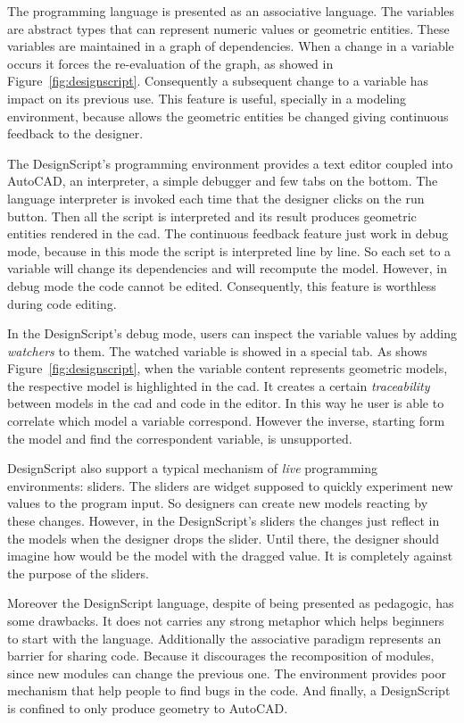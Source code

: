 The programming language is presented as an associative language. The variables are abstract types that can represent numeric values or geometric entities. These variables are maintained in a graph of dependencies. When a change in a variable occurs it forces the re-evaluation of the graph, as showed in Figure~\ref{fig:designscript}. Consequently a subsequent change to a variable has impact on its previous use. This feature is useful, specially in a modeling environment, because allows the geometric entities be changed giving continuous feedback to the designer.

The DesignScript's programming environment provides a text editor coupled into AutoCAD, an interpreter, a simple debugger and few tabs on the bottom. The language interpreter is invoked each time that the designer clicks on the run button. Then all the script is interpreted and its result produces geometric entities rendered in the \ac{cad}. The continuous feedback feature just work in debug mode, because in this mode the script is interpreted line by line. So each set to a variable will change its dependencies and will recompute the model. However, in debug mode the code cannot be edited. Consequently, this feature is worthless during code editing.

In the DesignScript's debug mode, users can inspect the variable values by adding \textit{watchers} to them. The watched variable is showed in a special tab. As shows Figure~\ref{fig:designscript}, when the variable content represents geometric models, the respective model is highlighted in the \ac{cad}. It creates a certain \textit{traceability} between models in the \ac{cad} and code in the editor. In this way he user is able to correlate which model a variable correspond. However the inverse, starting form the model and find the correspondent variable, is unsupported.

DesignScript also support a typical mechanism of \textit{live} programming environments: sliders. The sliders are widget supposed to quickly experiment new values to the program input. So designers can create new models reacting by these changes. However, in the DesignScript's sliders the changes just reflect in the models when the designer drops the slider. Until there, the designer should imagine how would be the model with the dragged value. It is completely against the purpose of the sliders.

Moreover the DesignScript language, despite of being presented as pedagogic, has some drawbacks. It does not carries any strong metaphor which helps beginners to start with the language. Additionally the associative paradigm represents an barrier for sharing code. Because it discourages the recomposition of modules, since new modules can change the previous one. The environment provides poor mechanism that help people to find bugs in the code. And finally, a DesignScript is confined to only produce geometry to AutoCAD.
